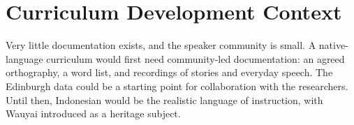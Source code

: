 \documentclass[12pt]{article}
\begin{document}
\section{Curriculum Development Context}
Very little documentation exists, and the speaker community is small. A native-language curriculum would first need community-led documentation: an agreed orthography, a word list, and recordings of stories and everyday speech. The Edinburgh data could be a starting point for collaboration with the researchers. Until then, Indonesian would be the realistic language of instruction, with Wauyai introduced as a heritage subject.
\end{document}
